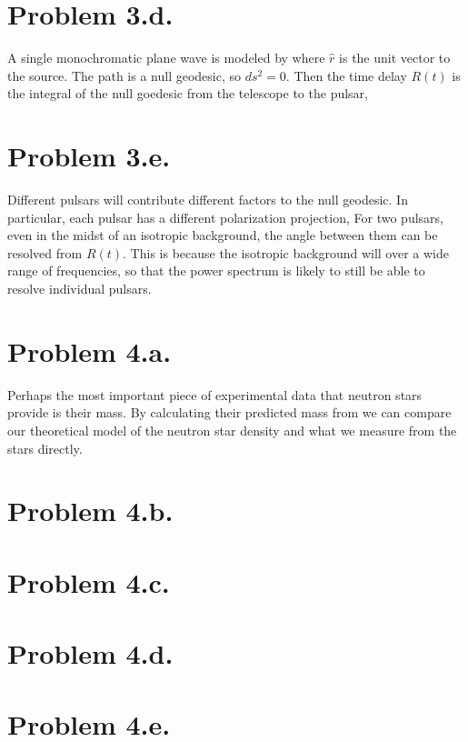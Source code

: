 \documentclass{article}
\begin{document}
\section*{Problem 3.d.}
A single monochromatic plane wave is modeled by
where $\hat{r}$ is the unit vector to the source. The path is a null geodesic, so $ds^2=0$. Then the time delay $R(t)$ is the integral of the null goedesic from the telescope to the pulsar,
\section*{Problem 3.e.}
Different pulsars will contribute different factors to the null geodesic. In particular, each pulsar has a different polarization projection,
For two pulsars, even in the midst of an isotropic background, the angle between them can be resolved from $R(t)$. This is because the isotropic background will  over a wide range of frequencies, so that the power spectrum is likely to still be able to resolve individual pulsars.
\section*{Problem 4.a.}
Perhaps the most important piece of experimental data that neutron stars provide is their mass. By calculating their predicted mass from
we can compare our theoretical model of the neutron star density and what we measure from the stars directly.
\section*{Problem 4.b.}
\section*{Problem 4.c.}
\section*{Problem 4.d.}
\section*{Problem 4.e.}
\end{document}
